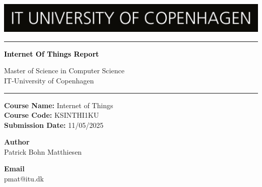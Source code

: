 \documentclass[a4paper,12pt]{report}
\begin{document}

\begin{titlepage}

\centering
\includegraphics[width=\textwidth]{pictures//ITU_logo_en.jpg}
	\textcolor{black}{\rule{\linewidth}{1pt}} \par
     {\Huge\bfseries \textcolor{black}{Internet Of Things Report}\par} 
	\vspace{1pt} {Master of Science in Computer Science \\ 
	IT-University of Copenhagen \par}
	\textcolor{black}{\rule{\linewidth}{1pt}} \par
	\vspace*{0.25cm}
 \textbf{Course Name:} Internet of Things\\
\textbf{Course Code:} KSINTHI1KU\\
\textbf{Submission Date:} 11/05/2025\\
 
\vspace*{0.25cm}
 
\begin{minipage}{0.70\textwidth}
    \begin{flushleft} \large
        \textbf{Author}\\
        Patrick Bohn Matthiesen 
    \end{flushleft}
    \end{minipage}
    \begin{minipage}{0.25\textwidth}
    \begin{flushright} \large
        \textbf{Email}\\
        pmat@itu.dk
    \end{flushright}
\end{minipage}


\end{titlepage}

\tableofcontents %
\cleardoublepage{} %


\cleardoublepage{}


\cleardoublepage{}


\cleardoublepage{}
\end{document}
